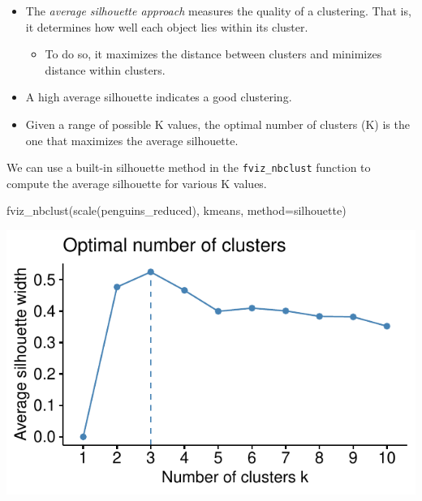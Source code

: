 \documentclass[
  letterpaper,
  DIV=11,
  numbers=noendperiod]{scrartcl}
\newenvironment{Shaded}{\begin{snugshade}}{\end{snugshade}}
\newcommand{\AttributeTok}[1]{\textcolor[rgb]{0.40,0.45,0.13}{#1}}
\newcommand{\FunctionTok}[1]{\textcolor[rgb]{0.28,0.35,0.67}{#1}}
\newcommand{\NormalTok}[1]{\textcolor[rgb]{0.00,0.23,0.31}{#1}}
\newcommand{\StringTok}[1]{\textcolor[rgb]{0.13,0.47,0.30}{#1}}
\providecommand{\tightlist}{%
  \setlength{\itemsep}{0pt}\setlength{\parskip}{0pt}}\usepackage{longtable,booktabs,array}
\begin{document}
\begin{itemize}
\item
  The \emph{average silhouette approach} measures the quality of a
  clustering. That is, it determines how well each object lies within
  its cluster.

  \begin{itemize}
  \tightlist
  \item
    To do so, it maximizes the distance between clusters and minimizes
    distance within clusters.
  \end{itemize}
\item
  A high average silhouette indicates a good clustering.
\item
  Given a range of possible K values, the optimal number of clusters (K)
  is the one that maximizes the average silhouette.
\end{itemize}

We can use a built-in silhouette method in the \texttt{fviz\_nbclust}
function to compute the average silhouette for various K values.

\begin{Shaded}
\begin{Highlighting}[]
\FunctionTok{fviz\_nbclust}\NormalTok{(}\FunctionTok{scale}\NormalTok{(penguins\_reduced), kmeans, }\AttributeTok{method=}\StringTok{\textquotesingle{}silhouette\textquotesingle{}}\NormalTok{)}
\end{Highlighting}
\end{Shaded}

\begin{center}
\includegraphics{K-Means-Mini-Demo_files/figure-pdf/unnamed-chunk-9-1.pdf}
\end{center}
\end{document}
